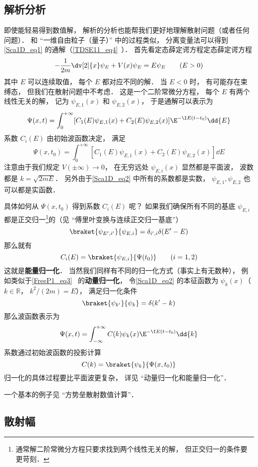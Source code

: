\subsection{解析分析}
即使能轻易得到数值解， 解析的分析也能帮我们更好地理解散射问题（或者任何问题）． 和 “一维自由粒子（量子）” 中的过程类似， 分离变量法可以得到\autoref{Sca1D_eq1} 的通解（\autoref{TDSE11_eq4}~）． 首先看定态薛定谔方程定态薛定谔方程
\begin{equation}\label{Sca1D_eq2}
-\frac{1}{2m}\dv[2]{x}\psi_E + V(x) \psi_E = E \psi_E \qquad (E > 0)
\end{equation}
其中 $E$ 可以连续取值， 每个 $E$ 都对应不同的解． 当 $E< 0$ 时， 有可能存在束缚态， 但我们在散射问题中不考虑． 这是一个二阶常微分方程， 每个 $E$ 有两个线性无关的解， 记为 $\psi_{E,1}(x)$ 和 $\psi_{E,2}(x)$， 于是通解可以表示为
\begin{equation}
\Psi(x, t) = \int_0^{+\infty} [C_1(E) \psi_{E,1}(x) + C_2(E) \psi_{E,2}(x)] \E^{-\I E (t-t_0)} \dd{E}
\end{equation}
系数 $C_i(E)$ 由初始波函数决定， 满足
\begin{equation}
\Psi(x, t_0) = \int_0^{+\infty} [C_1(E) \psi_{E,1}(x) + C_2(E) \psi_{E,2}(x)] \dd{E}
\end{equation}
注意由于我们规定 $V(\pm\infty)\to 0$， 在无穷远处 $\psi_{E,i}(x)$ 显然都是平面波， 波数都是 $k = \sqrt{2mE}$． 另外由于\autoref{Sca1D_eq2} 中所有的系数都是实数， $\psi_{E,1}, \psi_{E,2}$ 也可以都是实函数．

具体如何从 $\Psi(x, t_0)$ 得到系数 $C_i(E)$ 呢？ 如果我们确保所有不同的基底 $\psi_{E,i}$ 都是正交归一\footnote{通常解二阶常微分方程只要求找到两个线性无关的解， 但正交归一的条件要更苛刻．}的（见 “傅里叶变换与连续正交归一基底”）
\begin{equation}
\braket{\psi_{E',i'}}{\psi_{E,i}} = \delta_{i',i}\delta(E' - E)
\end{equation}
那么就有
\begin{equation}
C_i(E) = \braket{\psi_{E,i}}{\Psi(t_0)} \qquad (i = 1,2)
\end{equation}
这就是\textbf{能量归一化}． 当然我们同样有不同的归一化方式（事实上有无数种）， 例如类似于\autoref{FreeP1_eq3}~ 的\textbf{动量归一化}， 令\autoref{Sca1D_eq2} 的本征函数为 $\psi_{k}(x)$（$k \in \mathbb R$， $k^2/(2m) = E$）， 满足归一化条件
\begin{equation}
\braket{\psi_{k'}}{\psi_{k}} = \delta(k' - k)
\end{equation}
那么波函数表示为
\begin{equation}\label{Sca1D_eq3}
\Psi(x, t) = \int_{-\infty}^{+\infty} C(k) \psi_k(x)\E^{-\I E (t-t_0)} \dd{k}
\end{equation}
系数通过初始波函数的投影计算
\begin{equation}
C(k) = \braket{\psi_k}{\Psi(x, t_0)}
\end{equation}
归一化的具体过程要比平面波更复杂， 详见 “动量归一化和能量归一化”．

一个基本的例子见 “方势垒散射数值计算”．

\subsection{散射幅}
